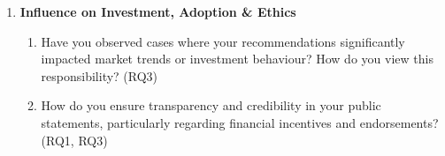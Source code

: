 \begin{enumerate}[label=\textbf{\arabic*.}, leftmargin=8mm, nosep]
\begin{enumerate}[label=Q\arabic*., leftmargin=8mm, start=7, nosep]
  \end{enumerate}
  \item \textbf{Influence on Investment, Adoption \& Ethics}
  \begin{enumerate}[label=Q\arabic*., leftmargin=8mm, start=9, nosep]
    \item Have you observed cases where your recommendations significantly impacted market trends or investment behaviour? How do you view this responsibility? \hfill{(RQ3)}
    \item How do you ensure transparency and credibility in your public statements, particularly regarding financial incentives and endorsements? \hfill{(RQ1, RQ3)}
  \end{enumerate}
\end{enumerate}

% 

% 

% 
